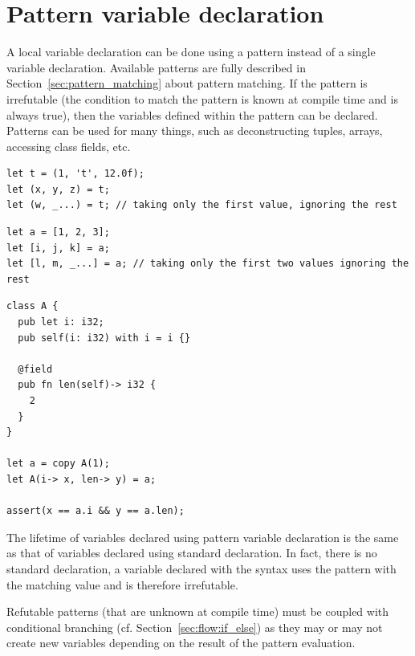 \section{Pattern variable declaration}
\label{sec:memory:pattern_vdecl}

A local variable declaration can be done using a pattern instead of a single
variable declaration. Available patterns are fully described in
Section~\ref{sec:pattern_matching} about pattern matching. If the pattern is
irrefutable (the condition to match the pattern is known at compile time and is
always true), then the variables defined within the pattern can be declared.
Patterns can be used for many things, such as deconstructing tuples, arrays,
accessing class fields, etc.

\begin{lstlisting}[style=coloredverbatim, escapechar=@, caption=Tuple deconstruction]
let t = (1, 't', 12.0f);
let (x, y, z) = t;
let (w, _...) = t; // taking only the first value, ignoring the rest
\end{lstlisting}

\begin{lstlisting}[style=coloredverbatim, escapechar=@, caption=Array deconstruction]
let a = [1, 2, 3];
let [i, j, k] = a;
let [l, m, _...] = a; // taking only the first two values ignoring the rest
\end{lstlisting}

\begin{lstlisting}[style=coloredverbatim, caption=Class field access]
class A {
  pub let i: i32;
  pub self(i: i32) with i = i {}

  @field
  pub fn len(self)-> i32 {
    2
  }
}

let a = copy A(1);
let A(i-> x, len-> y) = a;

assert(x == a.i && y == a.len);
\end{lstlisting}

The lifetime of variables declared using pattern variable declaration is the
same as that of variables declared using standard declaration. In fact, there is
no standard declaration, a variable declared with the syntax  uses the pattern  with the matching value 
and is therefore irrefutable.

Refutable patterns (that are unknown at compile time) must be coupled with
conditional branching (cf. Section~\ref{sec:flow:if_else}) as they may or may not
create new variables depending on the result of the pattern evaluation.

